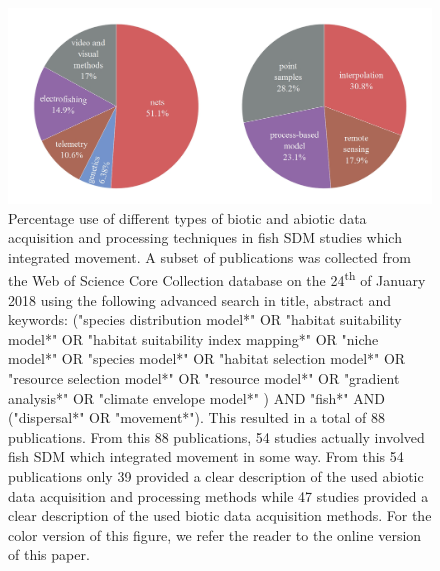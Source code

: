 \documentclass[12pt,authoryear]{elsarticle}
\begin{document}
\newpage

\appendix

\setcounter{figure}{0} \renewcommand{\thefigure}{A.\arabic{figure}}


\section{}

\begin{figure}[!ht]
  \centering
	\includegraphics[scale=0.35]{Figure3}
  \caption{Percentage use of different types of biotic and abiotic data acquisition and processing techniques in fish SDM studies which integrated movement. A subset of publications was collected from the Web of Science Core Collection database on the 24\textsuperscript{th} of January 2018 using the following advanced search in title, abstract and keywords: ("species distribution model*" OR "habitat suitability model*" OR "habitat suitability index mapping*" OR "niche model*" OR "species model*" OR "habitat selection model*" OR "resource selection model*" OR "resource model*" OR "gradient analysis*" OR "climate envelope model*" ) AND "fish*" AND ("dispersal*" OR "movement*"). This resulted in a total of 88 publications. From this 88 publications, 54 studies actually involved fish SDM which integrated movement in some way. From this 54 publications only 39 provided a clear description of the used abiotic data acquisition and processing methods while 47 studies provided a clear description of the used biotic data acquisition methods. For the color version of this figure, we refer the reader to the online version of this paper.}
  \label{fig:Figure3}
\end{figure}
\end{document}
